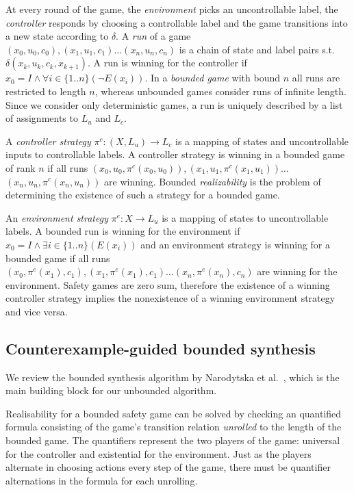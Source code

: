 \documentclass{llncs}
\begin{document}
At every round of the game, the \emph{environment} picks an
uncontrollable label, the \emph{controller} responds by choosing a controllable 
label and the game transitions into a new state according to $\delta$. 
A \emph{run} of a game $(x_0, u_0, c_0), (x_1, u_1, c_1) \dots (x_n, u_n,
c_n)$ is a chain of state and label pairs s.t.\,$\delta(x_k, u_k, c_k, x_{k+1})$. 
A run is winning for the controller if $x_0 = I \land \forall i \in \{1..n\} (\lnot E(x_i))$. 
In a \emph{bounded game} with bound $n$ all runs are restricted to length $n$, whereas unbounded 
games consider runs of infinite length. Since we consider only deterministic games, a run 
is uniquely described by a list of assignments to $L_u$ and $L_c$.

A \emph{controller strategy} $\pi^c : (X, L_u) \to L_c$ is a mapping of states
and uncontrollable inputs to controllable labels. A controller strategy is
winning in a bounded game of rank $n$ if all runs $(x_0, u_0, \pi^c(x_0, u_0)),
(x_1, u_1, \pi^c(x_1, u_1)) \dots$ $(x_n, u_n, \pi^c(x_n, u_n))$ are winning.
Bounded \emph{realizability} is the problem of determining the existence of
such a strategy for a bounded game.

An \emph{environment strategy} $\pi^e : X \to L_u$ is a mapping of states to
uncontrollable labels. A bounded run is winning for the environment if $x_0
= I \land \exists i \in \{1..n\} (E(x_i))$ and an environment strategy is
winning for a bounded game if all runs $(x_0, \pi^e(x_1), c_1), (x_1,
\pi^e(x_1), c_1) \dots (x_n, \pi^e(x_n), c_n)$ are winning for the environment.
Safety games are zero sum, therefore the existence of a winning controller strategy
implies the nonexistence of a winning environment strategy and vice versa.

\subsection{Counterexample-guided bounded synthesis}

We review the bounded synthesis algorithm by Narodytska et
al.~\cite{narodytska2014}, which is the main building block for our unbounded
algorithm.

Realisability for a bounded safety game can be solved by checking an
quantified formula consisting of the game's transition relation \emph{unrolled}
to the length of the bounded game. The quantifiers represent the two players of
the game: universal for the controller and existential for the environment.
Just as the players alternate in choosing actions every step of the game, there
must be quantifier alternations in the formula for each unrolling.
\end{document}
